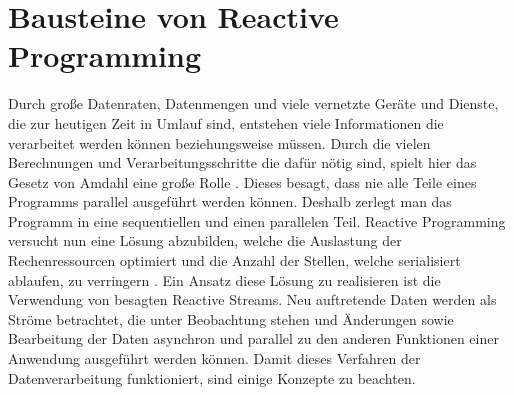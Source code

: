 \chapter{Bausteine von Reactive Programming}\label{realisierung} 
Durch große Datenraten, Datenmengen und viele vernetzte Geräte und Dienste, die zur heutigen Zeit in Umlauf sind, entstehen viele Informationen die verarbeitet werden können beziehungsweise müssen. Durch die vielen Berechnungen und Verarbeitungsschritte die dafür nötig sind, spielt hier das Gesetz von Amdahl eine große Rolle \cite{Amdahl.}. Dieses besagt, dass nie alle Teile eines Programms parallel ausgeführt werden können. Deshalb zerlegt man das Programm in eine sequentiellen und einen parallelen Teil. Reactive Programming versucht nun eine Lösung abzubilden, welche die Auslastung der Rechenressourcen optimiert und die Anzahl der Stellen, welche serialisiert ablaufen, zu verringern \cite{Boner.}. Ein Ansatz diese Lösung zu realisieren ist die Verwendung von besagten Reactive Streams. Neu auftretende Daten werden als Ströme betrachtet, die unter Beobachtung stehen und Änderungen sowie Bearbeitung der Daten asynchron und parallel zu den anderen Funktionen einer Anwendung ausgeführt werden können. Damit dieses Verfahren der Datenverarbeitung funktioniert, sind einige Konzepte zu beachten.
